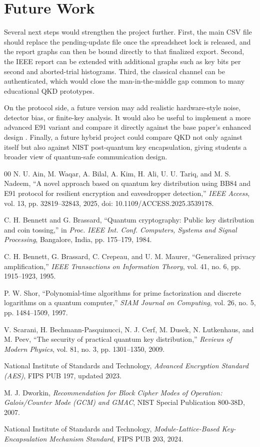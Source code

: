\documentclass[conference]{IEEEtran}
\begin{document}
\section{Future Work}
Several next steps would strengthen the project further. First, the main CSV file should replace the pending-update file once the spreadsheet lock is released, and the report graphs can then be bound directly to that finalized export. Second, the IEEE report can be extended with additional graphs such as key bits per second and aborted-trial histograms. Third, the classical channel can be authenticated, which would close the man-in-the-middle gap common to many educational QKD prototypes.

On the protocol side, a future version may add realistic hardware-style noise, detector bias, or finite-key analysis. It would also be useful to implement a more advanced E91 variant and compare it directly against the base paper's enhanced design \cite{ain2025novel}. Finally, a future hybrid project could compare QKD not only against itself but also against NIST post-quantum key encapsulation, giving students a broader view of quantum-safe communication design.

\begin{thebibliography}{00}
N. U. Ain, M. Waqar, A. Bilal, A. Kim, H. Ali, U. U. Tariq, and M. S. Nadeem, ``A novel approach based on quantum key distribution using BB84 and E91 protocol for resilient encryption and eavesdropper detection,'' \emph{IEEE Access}, vol. 13, pp. 32819--32843, 2025, doi: 10.1109/ACCESS.2025.3539178.

C. H. Bennett and G. Brassard, ``Quantum cryptography: Public key distribution and coin tossing,'' in \emph{Proc. IEEE Int. Conf. Computers, Systems and Signal Processing}, Bangalore, India, pp. 175--179, 1984.

C. H. Bennett, G. Brassard, C. Crepeau, and U. M. Maurer, ``Generalized privacy amplification,'' \emph{IEEE Transactions on Information Theory}, vol. 41, no. 6, pp. 1915--1923, 1995.

P. W. Shor, ``Polynomial-time algorithms for prime factorization and discrete logarithms on a quantum computer,'' \emph{SIAM Journal on Computing}, vol. 26, no. 5, pp. 1484--1509, 1997.

V. Scarani, H. Bechmann-Pasquinucci, N. J. Cerf, M. Dusek, N. Lutkenhaus, and M. Peev, ``The security of practical quantum key distribution,'' \emph{Reviews of Modern Physics}, vol. 81, no. 3, pp. 1301--1350, 2009.

National Institute of Standards and Technology, \emph{Advanced Encryption Standard (AES)}, FIPS PUB 197, updated 2023.

M. J. Dworkin, \emph{Recommendation for Block Cipher Modes of Operation: Galois/Counter Mode (GCM) and GMAC}, NIST Special Publication 800-38D, 2007.

National Institute of Standards and Technology, \emph{Module-Lattice-Based Key-Encapsulation Mechanism Standard}, FIPS PUB 203, 2024.
\end{thebibliography}
\end{document}
